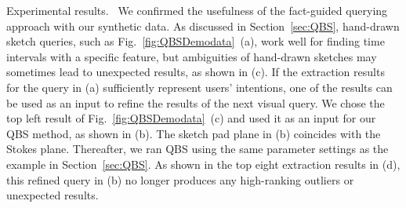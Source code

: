 \textsf{Experimental results.\ } We confirmed the usefulness of the fact-guided querying approach with our synthetic data.
As discussed in Section~\ref{sec:QBS}, 
hand-drawn sketch queries, such as Fig.~\ref{fig:QBSDemodata}~(a), work well for finding time intervals with a specific feature,
but ambiguities of hand-drawn sketches may sometimes lead to unexpected results, as shown in (c).
%
If the extraction results for the query in (a) sufficiently represent users' intentions, one of the results can be used as an input to refine the results of the next visual query.
We chose the top left result of Fig.~\ref{fig:QBSDemodata}~(c) and used it as an input for our QBS method, as shown in (b). 
The sketch pad plane in (b) coincides with the Stokes plane.
Thereafter, we ran QBS using the same parameter settings as the example in Section~\ref{sec:QBS}.
As shown in the top eight extraction results in (d),  %
this refined query in (b) no longer produces any high-ranking outliers or unexpected results.



